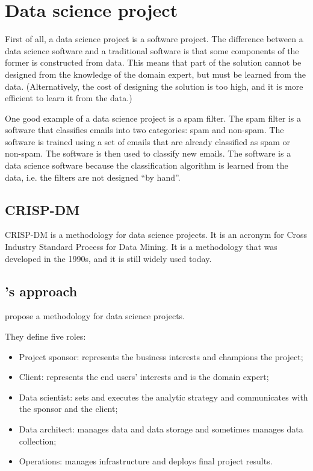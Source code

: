 \chapter{Data science project}

First of all, a data science project is a software project.  The difference between a data
science software and a traditional software is that some components of the former is
constructed from data.  This means that part of the solution cannot be designed from the
knowledge of the domain expert, but must be learned from the data.  (Alternatively, the
cost of designing the solution is too high, and it is more efficient to learn it from the data.)

One good example of a data science project is a spam filter.  The spam filter is a software
that classifies emails into two categories: spam and non-spam.  The software is trained
using a set of emails that are already classified as spam or non-spam.  The software is
then used to classify new emails.  The software is a data science software because the
classification algorithm is learned from the data, i.e. the filters are not designed ``by
hand''.


\section{CRISP-DM}

CRISP-DM is a methodology for data science projects.  It is an acronym for Cross Industry
Standard Process for Data Mining.  It is a methodology that was developed in the 1990s, and
it is still widely used today.

\section{\citeauthor{Zumel2019}'s approach}

\textcite{Zumel2019} propose a methodology for data science projects.

They define five roles:
\begin{itemize}
  \item Project sponsor: represents the business interests and champions the project;
  \item Client: represents the end users’ interests and is the domain expert;
  \item Data scientist: sets and executes the analytic strategy and communicates with the
    sponsor and the client;
  \item Data architect: manages data and data storage and sometimes manages data
    collection;
  \item Operations: manages infrastructure and deploys final project results.
\end{itemize}

